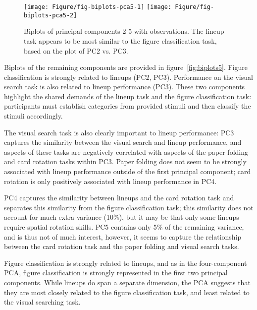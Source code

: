 \documentclass[journal]{vgtc}\usepackage[]{graphicx}\usepackage[]{color}
\newenvironment{knitrout}{}{} %
\begin{document}
\begin{knitrout}
\color{fgcolor}\begin{figure}[]


{\centering \texttt{[image: Figure/fig-biplots-pca5-1]} 
\texttt{[image: Figure/fig-biplots-pca5-2]} 

}

\caption{Biplots of principal components 2-5 with observations. The lineup task appears to be most similar to the figure classification task, based on the plot of PC2 vs. PC3.  \label{fig:biplots5}\label{fig:biplots-pca5}}
\end{figure}


\end{knitrout}

Biplots \cite{biplots:gabriel} of the remaining components are provided in figure~\ref{fig:biplots5}. Figure classification is strongly related to lineups (PC2, PC3). Performance on the visual search task  is also related to lineup performance (PC3). These two components highlight the shared demands of the lineup task and the figure classification task: participants must establish categories from provided stimuli and then classify the stimuli accordingly. 

The visual search task is also clearly important to lineup performance: PC3 captures the similarity between the visual search and lineup performance, and aspects of these tasks are negatively correlated with aspects of the paper folding and card rotation tasks within PC3. Paper folding does not seem to be strongly associated with lineup performance outside of the first principal component; card rotation is only positively associated with lineup performance in PC4.

PC4 captures the similarity between lineups and the card rotation task and separates this similarity from the figure classification task; this similarity does not account for much extra variance (10\%), but it may be that only some lineups require spatial rotation skills. PC5 contains only 5\% of the remaining variance, and is thus not of much interest, however, it seems to capture the relationship between the card rotation task and the paper folding and visual search tasks.

Figure classification is strongly related to lineups, and as in the four-component PCA, figure classification is strongly represented in the first two principal components. While lineups do span a separate dimension, the PCA suggests that they are most closely related to the figure classification task, and least related to the visual searching task.
\end{document}
